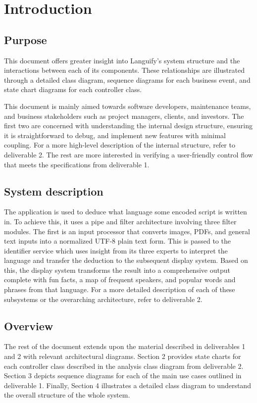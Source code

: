 \section{Introduction}
\label{sec:introduction}


\subsection{Purpose}
\label{sub:purpose}
This document offers greater insight into Languify’s system structure and the interactions between each of its components. These relationships are illustrated through a detailed class diagram, sequence diagrams for each business event, and state chart diagrams for each controller class.\newline


\noindent This document is mainly aimed towards software developers, maintenance teams, and business stakeholders such as project managers, clients, and investors. The first two are concerned with understanding the internal design structure, ensuring it is straightforward to debug, and implement new features with minimal coupling. For a more high-level description of the internal structure, refer to deliverable 2. The rest are more interested in verifying a user-friendly control flow that meets the specifications from deliverable 1.


\subsection{System description}
\label{sub:system_description}
The application is used to deduce what language some encoded script is written in. To achieve this, it uses a pipe and filter architecture involving three filter modules. The first is an input processor that converts images, PDFs, and general text inputs into a normalized UTF-8 plain text form. This is passed to the identifier service which uses insight from its three experts to interpret the language and transfer the deduction to the subsequent display system. Based on this, the display system transforms the result into a comprehensive output complete with fun facts, a map of frequent speakers, and popular words and phrases from that language. For a more detailed description of each of these subsystems or the overarching architecture, refer to deliverable 2. 


\subsection{Overview}
\label{sub:overview}
The rest of the document extends upon the material described in deliverables 1 and 2 with relevant architectural diagrams. Section 2 provides state charts for each controller class described in the analysis class diagram from deliverable 2. Section 3 depicts sequence diagrams for each of the main use cases outlined in deliverable 1. Finally, Section 4 illustrates a detailed class diagram to understand the overall structure of the whole system.  

